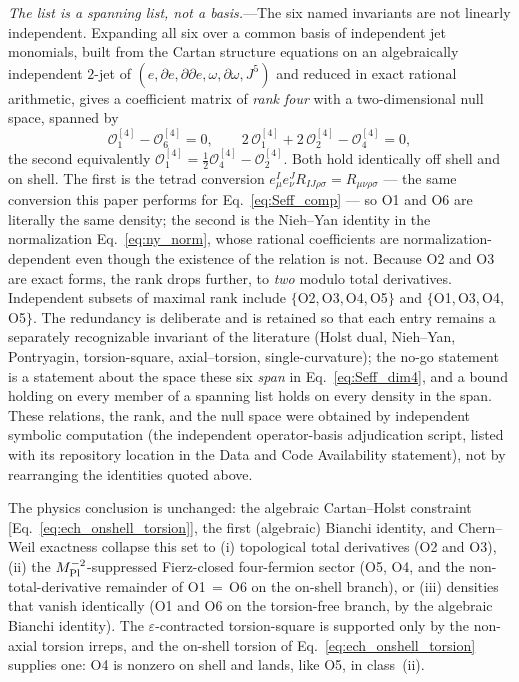 \documentclass[aps,prd,twocolumn,superscriptaddress,showpacs,preprintnumbers,nofootinbib,longbibliography,floatfix]{revtex4-2}
\newcommand{\MPl}{M_{\rm Pl}}
\begin{document}
\emph{The list is a spanning list, not a basis.}---The six named
invariants are not linearly independent. Expanding all six over a common
basis of independent jet monomials, built from the Cartan structure
equations on an algebraically independent $2$-jet of
$(e,\partial e,\partial\partial e,\omega,\partial\omega,J^5)$ and reduced
in exact rational arithmetic, gives a coefficient matrix of \emph{rank
four} with a two-dimensional null space, spanned by
\begin{equation}\label{eq:dim4_relations}
\mathcal{O}_1^{[4]}-\mathcal{O}_6^{[4]}=0,
\qquad
2\,\mathcal{O}_1^{[4]}+2\,\mathcal{O}_2^{[4]}-\mathcal{O}_4^{[4]}=0,
\end{equation}
the second equivalently
$\mathcal{O}_1^{[4]}=\tfrac12\mathcal{O}_4^{[4]}-\mathcal{O}_2^{[4]}$.
Both hold identically off shell and on shell. The first is the tetrad
conversion $e^I_\mu e^J_\nu R_{IJ\rho\sigma}=R_{\mu\nu\rho\sigma}$ --- the
same conversion this paper performs for Eq.~\eqref{eq:Seff_comp} --- so
O1 and O6 are literally the same density; the second is the Nieh--Yan
identity in the normalization Eq.~\eqref{eq:ny_norm}, whose rational
coefficients are normalization-dependent even though the existence of the
relation is not. Because O2 and O3 are exact forms, the rank drops
further, to \emph{two} modulo total derivatives. Independent subsets of
maximal rank include $\{$O2,\,O3,\,O4,\,O5$\}$ and
$\{$O1,\,O3,\,O4,\,O5$\}$. The redundancy is deliberate and is retained
so that each entry remains a separately recognizable invariant of the
literature (Holst dual, Nieh--Yan, Pontryagin, torsion-square,
axial--torsion, single-curvature); the no-go statement is a statement
about the space these six \emph{span} in
Eq.~\eqref{eq:Seff_dim4}, and a bound holding on every
member of a spanning list holds on every density in the span. These
relations, the rank, and the null space were obtained by independent
symbolic computation
(the independent operator-basis adjudication script, listed with its
repository location in the Data and Code Availability statement),
not by rearranging the identities quoted above.

The physics
conclusion is unchanged: the algebraic Cartan--Holst constraint
[Eq.~\eqref{eq:ech_onshell_torsion}], the
first (algebraic) Bianchi identity, and Chern--Weil exactness collapse this
set to (i) topological total derivatives (O2 and O3),
(ii) the $\MPl^{-2}$-suppressed Fierz-closed four-fermion sector (O5, O4,
and the non-total-derivative remainder of O1$\,=\,$O6 on the on-shell
branch),
or (iii) densities that vanish identically (O1 and O6 on the torsion-free
branch, by the algebraic Bianchi identity). The
$\varepsilon$-contracted torsion-square is supported only by
the non-axial torsion irreps, and the on-shell torsion of
Eq.~\eqref{eq:ech_onshell_torsion} supplies one: O4 is nonzero on shell
and lands, like O5, in class~(ii).
\end{document}
